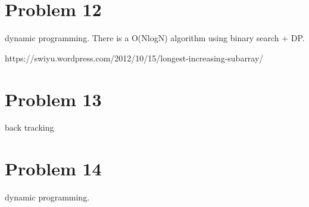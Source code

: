 \documentclass[12pt]{amsart}
\begin{document}
\section{Problem 12}
dynamic programming. There is a O(NlogN) algorithm using binary search + DP. 

https://swiyu.wordpress.com/2012/10/15/longest-increasing-subarray/




\section{Problem 13}
back tracking

\section{Problem 14}
dynamic programming.


\end{document}
